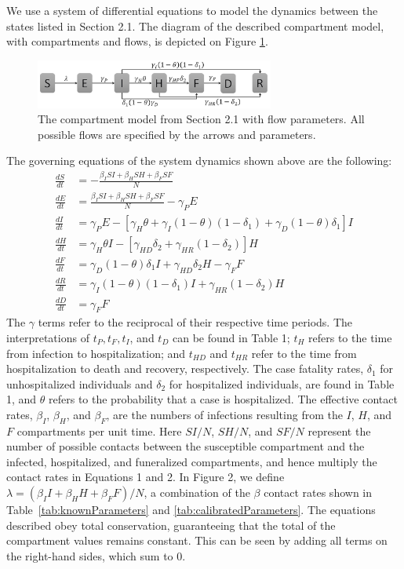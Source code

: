 We use a system of differential equations to model the dynamics between the states listed in Section 2.1. The diagram of the described compartment model, with compartments and flows, is depicted on Figure \ref{fig:compartment}.

\begin{figure}[!h]
  \centering
  \includegraphics[width=0.7\textwidth]{compartment}
  \caption{The compartment model from Section 2.1 with flow parameters. All possible flows are specified by the arrows and parameters. } 
\label{fig:compartment} 
\end{figure}


The governing equations of the system dynamics shown above are the following:
\begin{align}
\frac{dS}{dt} &= - \frac{\beta_{I}SI+\beta_{H}SH+\beta_{F}SF}{N} \label{eqn:SD1}\\
\frac{dE}{dt} &=  \frac{\beta_{I}SI+\beta_{H}SH+\beta_{F}SF}{N}-\gamma_P E         \label{eqn:SD2}\\
\frac{dI}{dt} &=  \gamma_P E - [\gamma_{H}\theta + \gamma_{I}(1-\theta)(1-\delta_{1})+\gamma_{D}(1-\theta)\delta_{1}]I \label{eqn:SD3}\\
\frac{dH}{dt} &= \gamma_{H}\theta I - [\gamma_{HD}\delta_{2}+\gamma_{HR}(1-\delta_{2})]H \label{eqn:SD4}\\
\frac{dF}{dt} &= \gamma_{D}(1-\theta) \delta_{1} I + \gamma_{HD}\delta_{2} H-\gamma_{F} F  \label{eqn:SD5}\\
\frac{dR}{dt} &= \gamma_{I}(1-\theta)(1- \delta_{1}) I + \gamma_{HR}(1-\delta_{2}) H       \label{eqn:SD6}\\
\frac{dD}{dt} &= \gamma_{F} F  \label{eqn:SD7}
\end{align}
The $\gamma$ terms refer to the reciprocal of their respective time periods. The interpretations of $t_P,t_F,t_I$, and $t_D$ can be found in Table 1; $t_H$ refers to the time from infection to hospitalization; and $t_{HD}$ and $t_{HR}$ refer to the time from hospitalization to death and recovery, respectively. The case fatality rates, $\delta_1$ for unhospitalized individuals and $\delta_2$ for hospitalized individuals, are found in Table 1, and $\theta$ refers to the probability that a case is hospitalized. The effective contact rates, $\beta_I$, $\beta_H$, and $\beta_F$, are the numbers of infections resulting from the $I$, $H$, and $F$ compartments per unit time. Here $SI/N$, $SH/N$, and $SF/N$ represent the number of possible contacts between the susceptible compartment and the infected, hospitalized, and funeralized compartments, and hence multiply the contact rates in Equations 1 and 2. In Figure 2, we define $\lambda = (\beta_{I}I+\beta_{H}H+\beta_{F}F)/N$, a combination of the $\beta$ contact rates shown in Table~\ref{tab:knownParameters} and \ref{tab:calibratedParameters}. The equations described obey total conservation, guaranteeing that the total of the compartment values remains constant. This can be seen by adding all terms on the right-hand sides, which sum to 0. 


